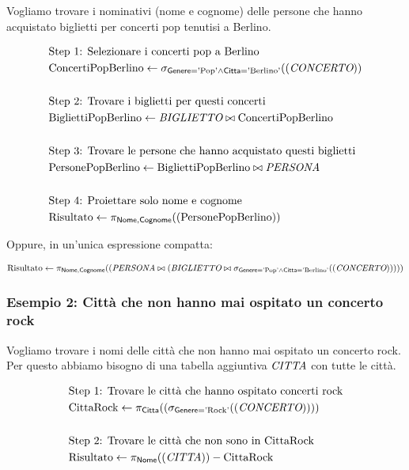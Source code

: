 	\noindent Vogliamo trovare i nominativi (nome e cognome) delle persone che hanno acquistato biglietti per concerti pop tenutisi a Berlino.
	
	\begin{align*}
		& \text{Step 1: Selezionare i concerti pop a Berlino} \\
		& \text{ConcertiPopBerlino} \leftarrow \sigma_{\textsf{Genere} = \text{'Pop'} \wedge \textsf{Citta} = \text{'Berlino'}}((\textit{CONCERTO})) \\
		& \\
		& \text{Step 2: Trovare i biglietti per questi concerti} \\
		& \text{BigliettiPopBerlino} \leftarrow \textit{BIGLIETTO} \bowtie \text{ConcertiPopBerlino} \\
		& \\
		& \text{Step 3: Trovare le persone che hanno acquistato questi biglietti} \\
		& \text{PersonePopBerlino} \leftarrow \text{BigliettiPopBerlino} \bowtie \textit{PERSONA} \\
		& \\
		& \text{Step 4: Proiettare solo nome e cognome} \\
		& \text{Risultato} \leftarrow \pi_{\textsf{Nome}, \textsf{Cognome}}((\text{PersonePopBerlino}))
	\end{align*}
	
	\noindent Oppure, in un'unica espressione compatta:
	
	\begin{align*}
		\text{Risultato} \leftarrow \pi_{\textsf{Nome}, \textsf{Cognome}}(( \textit{PERSONA} \bowtie (\textit{BIGLIETTO} \bowtie \sigma_{\textsf{Genere} = \text{'Pop'} \wedge \textsf{Citta} = \text{'Berlino'}}((\textit{CONCERTO})) )))
	\end{align*}
	
	\subsubsection{Esempio 2: Città che non hanno mai ospitato un concerto rock}
	
	\noindent Vogliamo trovare i nomi delle città che non hanno mai ospitato un concerto rock. Per questo abbiamo bisogno di una tabella aggiuntiva $\textit{CITTA}$ con tutte le città.
	
	\begin{align*}
		& \text{Step 1: Trovare le città che hanno ospitato concerti rock} \\
		& \text{CittaRock} \leftarrow \pi_{\textsf{Citta}}((\sigma_{\textsf{Genere} = \text{'Rock'}}((\textit{CONCERTO})))) \\
		& \\
		& \text{Step 2: Trovare le città che non sono in CittaRock} \\
		& \text{Risultato} \leftarrow \pi_{\textsf{Nome}}((\textit{CITTA})) - \text{CittaRock}
	\end{align*}
	
